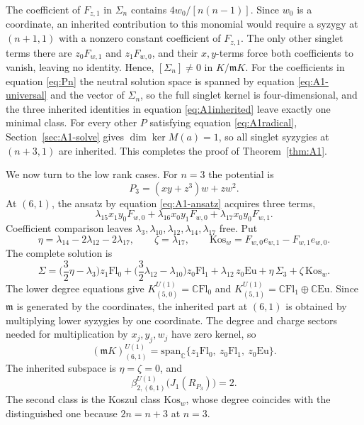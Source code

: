 \documentclass[10pt,reqno]{amsart}
\numberwithin{equation}{section}
\theoremstyle{plain}
\theoremstyle{definition}
\newcommand{\Eu}{\mathrm{Eu}}
\newcommand{\Kos}{\mathrm{Kos}}
\newcommand{\Fl}{\mathrm{Fl}}
\begin{document}
The coefficient of $F_{z,1}$ in $\Sigma_n$ contains $4w_0/[n(n-1)]$. Since $w_0$ is a coordinate, an inherited contribution to this monomial would require a syzygy at $(n+1,1)$ with a nonzero constant coefficient of $F_{z,1}$. The only other singlet terms there are $z_0F_{w,1}$ and $z_1F_{w,0}$, and their $x,y$-terms force both coefficients to vanish, leaving no identity. Hence, $[\Sigma_n]\neq0$ in $K/\mathfrak{m} K$. For the coefficients in equation \eqref{eq:Pn} the neutral solution space is spanned by equation \eqref{eq:A1-universal} and the vector of $\Sigma_n$, so the full singlet kernel is four-dimensional, and the three inherited identities in equation \eqref{eq:A1inherited} leave exactly one minimal class. For every other $P$ satisfying equation \eqref{eq:A1radical}, Section~\ref{sec:A1-solve} gives $\dim\ker M(a)=1$, so all singlet syzygies at $(n+3,1)$ are inherited. This completes the proof of Theorem~\ref{thm:A1}.

We now turn to the low rank cases. For $n=3$ the potential is
\begin{equation*}
	P_3=(xy+z^3)w+zw^2 .
\end{equation*}
At $(6,1)$, the ansatz by equation \eqref{eq:A1-ansatz} acquires three terms,
\begin{equation*}
    \lambda_{15}x_1y_0F_{w,0}+\lambda_{16}x_0y_1F_{w,0}+\lambda_{17}x_0y_0F_{w,1}.
\end{equation*}
Coefficient comparison leaves $\lambda_3,\lambda_{10},\lambda_{12},\lambda_{14},\lambda_{17}$ free. Put
\begin{equation*}
	\eta=\lambda_{14}-2\lambda_{12}-2\lambda_{17},\qquad \zeta=\lambda_{17},\qquad \Kos_w=F_{w,0}e_{w,1}-F_{w,1}e_{w,0}.
\end{equation*}
The complete solution is
\begin{equation*}
	\Sigma=\Big(\frac32\eta-\lambda_3\Big)z_1\Fl_0+\Big(\frac32\lambda_{12}-\lambda_{10}\Big)z_0\Fl_1+\lambda_{12}\,z_0\Eu+\eta\,\Sigma_3+\zeta\,\Kos_w .
\end{equation*}
The lower degree equations give $K^{U(1)}_{(5,0)}=\mathbb{C}\Fl_0$ and $K^{U(1)}_{(5,1)}=\mathbb{C}\Fl_1\oplus\mathbb{C}\Eu$. Since $\mathfrak{m}$ is generated by the coordinates, the inherited part at $(6,1)$ is obtained by multiplying lower syzygies by one coordinate. The degree and charge sectors needed for multiplication by $x_j,y_j,w_j$ have zero kernel, so
\begin{equation*}
	(\mathfrak{m} K)^{U(1)}_{(6,1)}=\mathrm{span}_\mathbb{C}\{z_1\Fl_0,\ z_0\Fl_1,\ z_0\Eu\}.
\end{equation*}
The inherited subspace is $\eta=\zeta=0$, and
\begin{equation*}
	\beta^{U(1)}_{2,(6,1)}\big(J_1(R_{P_3})\big)=2 .
\end{equation*}
The second class is the Koszul class $\Kos_w$, whose degree coincides with the distinguished one because $2n=n+3$ at $n=3$.
\end{document}

